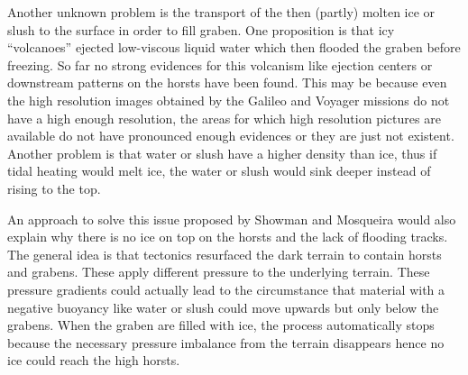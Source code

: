Another unknown problem is the transport of the then (partly) molten
ice or slush to the surface in order to fill graben. One proposition
is that icy ``volcanoes'' ejected low-viscous liquid water which
then flooded the graben before freezing. So far no strong evidences
for this volcanism like ejection centers or downstream patterns on
the horsts have been found\cite{Patterson2010}. This may be because
even the high resolution images obtained by the Galileo and Voyager
missions do not have a high enough resolution, the areas for which
high resolution pictures are available do not have pronounced enough
evidences or they are just not existent\cite{Patterson2010,Schenk2001,Showman2004}.
Another problem is that water or slush have a higher density than
ice, thus if tidal heating would melt ice, the water or slush would
sink deeper instead of rising to the top.

An approach to solve this issue proposed by Showman and Mosqueira
would also explain why there is no ice on top on the horsts and the
lack of flooding tracks. The general idea is that tectonics resurfaced
the dark terrain to contain horsts and grabens. These apply different
pressure to the underlying terrain. These pressure gradients could
actually lead to the circumstance that material with a negative buoyancy
like water or slush could move upwards but only below the grabens.
When the graben are filled with ice, the process automatically stops
because the necessary pressure imbalance from the terrain disappears
hence no ice could reach the high horsts\cite{Showman2004}. 

